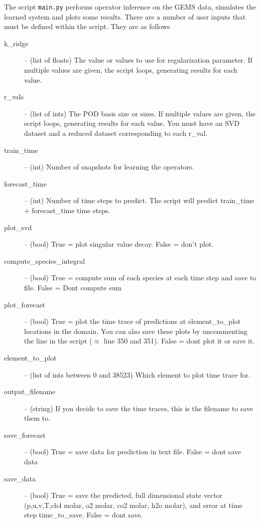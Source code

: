 \documentclass[11pt]{article} %
\newcommand{\code}[1]{\colorbox{light-gray}{\texttt{#1}}}
\begin{document}
The script \code{main.py} performs operator inference on the GEMS data, simulates the learned system and plots some results. There are a number of user inputs that must be defined within the script. They are as follows
\begin{description}
	\item[k\_ridge] -- (list of floats) The value or values to use for regularization parameter. If multiple values are given, the script loops, generating results for each value. 

	\item[r\_vals] -- (list of ints) The POD basis size or sizes. If multiple values are given, the script loops, generating results for each value. You must have an SVD dataset and a reduced dataset corresponding to each r\_val. 

	\item[train\_time] -- (int) Number of snapshots for learning the operators.

	\item[forecast\_time] -- (int) Number of time steps to predict. The script will predict train\_time + forecast\_time time steps.

	\item[plot\_svd] -- (bool) True = plot singular value decay. False = don't plot.

	\item[compute\_species\_integral] -- (bool) True = compute sum of each species at each time step and save to file. False = Dont compute sum 

	\item[plot\_forecast] -- (bool) True = plot the time trace of predictions at element\_to\_plot locations in the domain. You can also save these plots by uncommenting the line in the script ($\approx$ line 350 and 351). False = dont plot it or save it. 

	\item[element\_to\_plot] -- (list of ints between 0 and 38523) Which element to plot time trace for.

	\item[output\_filename] -- (string) If you decide to save the time traces, this is the filename to save them to. 

	\item[save\_forecast] -- (bool) True = save data for prediction in text file. False = dont save data

	\item[save\_data] -- (bool) True = save the predicted, full dimensional state vector (p,u,v,T,ch4 molar, o2 molar, co2 molar, h2o molar), and error at time step time\_to\_save. False = dont save. 


\end{description}
\end{document}
